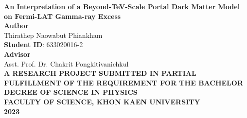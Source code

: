 \documentclass[10pt, oneside]{book}
\numberwithin{equation}{chapter}
\begin{document}
\begin{center}
    \large
	\textbf{An Interpretation of a Beyond-TeV-Scale Portal Dark Matter Model on Fermi-LAT Gamma-ray Excess} \\
	\vspace{5cm}
	\textbf{Author} \\
	Thirathep Naowabut Phiankham \\
	\textbf{Student ID}: 633020016-2 \\
	\vspace{4cm}
	\textbf{Advisor} \\
	Asst. Prof. Dr. Chakrit Pongkitivanichkul \\
	\vspace{5cm}
	\textbf{A RESEARCH PROJECT SUBMITTED IN PARTIAL FULFILLMENT OF THE  REQUIREMENT FOR THE BACHELOR DEGREE OF SCIENCE IN PHYSICS \\
		FACULTY OF SCIENCE, KHON KAEN UNIVERSITY \\
		\vspace{1cm}
		2023}
\end{center}
\thispagestyle{empty}
\newpage
\end{document}
